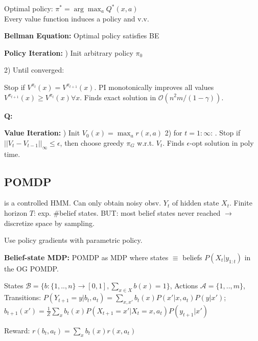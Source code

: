 Optimal policy: $\pi^* = \arg\max_a Q^*(x,a)$ \\
Every value function induces a policy and v.v.

\textbf{Bellman Equation:} \; {\fontsize{9.5}{6}\selectfont Optimal policy satisfies BE}



\textbf{Policy Iteration:} ) Init arbitrary policy $\pi_0$

2) Until converged: 

Stop if $V^{\pi_t}(x) = V^{\pi_{t+1}}(x)$.  PI monotonically improves all values $V^{\pi_{t+1}}(x) \geq V^{\pi_{t}}(x) \forall x$. Finds exact solution in $\mathcal{O}(n^2 m / (1-\gamma))$.

\textbf{Q:} \; 

\textbf{Value Iteration:} ) Init $V_0(x) = \max_a r(x,a)$ 2) for $t = 1:\infty$: . Stop if $||V_t - V_{t-1}||_\infty \leq \epsilon$, then choose greedy $\pi_G$ w.r.t. $V_t$. Finds $\epsilon$-opt solution in poly time.


\subsection*{POMDP} is a controlled HMM. Can only obtain noisy obsv. $Y_t$ of hidden state $X_t$. Finite horizon $T$: exp. \#belief states. BUT: most belief states never reached $\rightarrow$ discretize space by sampling.

Use policy gradients with parametric policy.

\textbf{Belief-state MDP:} POMDP as MDP where states $\equiv$ beliefs $P(X_t | y_{1:t})$ in the OG POMDP. 

States {\fontsize{9.5}{6}\selectfont $\mathcal{B} = \{b : \{1,..,n\} \rightarrow [0,1], \sum_{x \in X} b(x) = 1\}$,
Actions $\mathcal{A} = \{1,..,m\}$, 
Transitions: $P(Y_{t+1} = y | b_t, a_t) = \sum_{x,x'} b_t(x) P(x' | x, a_t) P(y | x')$;}
$b_{t+1}(x') = \frac{1}{Z} \sum_x b_t(x) P(X_{t+1} = x' | X_t = x, a_t) P(y_{t+1} | x')$

Reward: \; $r(b_t, a_t) = \sum_x b_t(x) r(x, a_t)$
